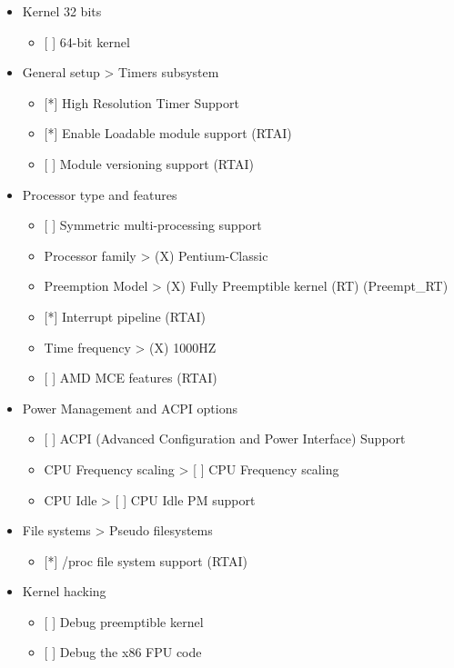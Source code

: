 \begin{itemize}
    \item Kernel 32 bits
    	\begin{itemize}
    		\item {[} {]} 64-bit kernel
    	\end{itemize}
    \item General setup > Timers subsystem
    	\begin{itemize}
    		\item {[}*{]} High Resolution Timer Support
    		\item {[}*{]} Enable Loadable module support (RTAI)
    		\item {[} {]} Module versioning support (RTAI)
    	\end{itemize}
    \item Processor type and features
    	\begin{itemize}
    		\item {[} {]} Symmetric multi-processing support
    		\item Processor family > (X) Pentium-Classic
    		\item Preemption Model > (X) Fully Preemptible kernel (RT) (Preempt\_RT)
    		\item {[}*{]} Interrupt pipeline (RTAI)
    		\item Time frequency > (X) 1000HZ
    		\item {[} {]} AMD MCE features (RTAI)
    	\end{itemize}
    \item Power Management and ACPI options
    	\begin{itemize}
    		\item {[} {]} ACPI (Advanced Configuration and Power Interface) Support
    		\item CPU Frequency scaling > {[} {]} CPU Frequency scaling
    		\item CPU Idle > {[} {]} CPU Idle PM support
    	\end{itemize}
    \item File systems > Pseudo filesystems
    	\begin{itemize}
    		\item {[}*{]} /proc file system support (RTAI)
    	\end{itemize}
    \item Kernel hacking
    	\begin{itemize}
    		\item {[} {]} Debug preemptible kernel
    		\item {[} {]} Debug the x86 FPU code
    	\end{itemize}
\end{itemize}


